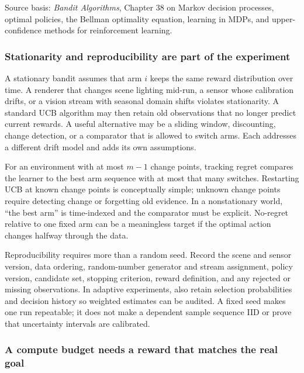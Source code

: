 Source basis: \emph{Bandit Algorithms}, Chapter 38 on Markov decision processes, optimal policies, the Bellman optimality equation, learning in MDPs, and upper-confidence methods for reinforcement learning.

\subsubsection{Stationarity and reproducibility are part of the experiment}\label{02-foundations-ii-ch029-stationarity-and-reproducibility-are-part-of-the-experiment}

\hypertarget{02-foundations-ii-ch029-stationarity-and-reproducibility-are-part-of-the-experiment}{}

A stationary bandit assumes that arm \(i\) keeps the same reward distribution over time. A renderer that changes scene lighting mid-run, a sensor whose calibration drifts, or a vision stream with seasonal domain shifts violates stationarity. A standard UCB algorithm may then retain old observations that no longer predict current rewards. A useful alternative may be a sliding window, discounting, change detection, or a comparator that is allowed to switch arms. Each addresses a different drift model and adds its own assumptions.

For an environment with at most \(m-1\) change points, tracking regret compares the learner to the best arm sequence with at most that many switches. Restarting UCB at known change points is conceptually simple; unknown change points require detecting change or forgetting old evidence. In a nonstationary world, ``the best arm'' is time-indexed and the comparator must be explicit. No-regret relative to one fixed arm can be a meaningless target if the optimal action changes halfway through the data.

Reproducibility requires more than a random seed. Record the scene and sensor version, data ordering, random-number generator and stream assignment, policy version, candidate set, stopping criterion, reward definition, and any rejected or missing observations. In adaptive experiments, also retain selection probabilities and decision history so weighted estimates can be audited. A fixed seed makes one run repeatable; it does not make a dependent sample sequence IID or prove that uncertainty intervals are calibrated.

\subsubsection{A compute budget needs a reward that matches the real goal}\label{02-foundations-ii-ch029-a-compute-budget-needs-a-reward-that-matches-the-real-goal}

